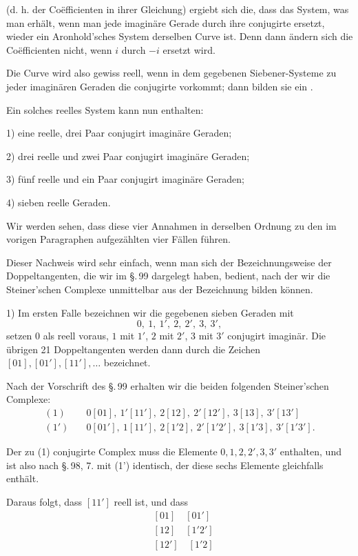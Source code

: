 (d. h. der Coëfficienten in ihrer Gleichung) ergiebt sich die, dass
das System, was man erhält, wenn man jede imaginäre Gerade
durch ihre conjugirte ersetzt, wieder ein Aronhold'sches System
derselben Curve ist. Denn dann ändern sich die Coëfficienten
nicht, wenn $i$ durch $-i$ ersetzt wird.

Die Curve wird also gewiss reell, wenn in dem gegebenen
Siebener-Systeme zu jeder imaginären Geraden die conjugirte
vorkommt; dann bilden sie ein .

Ein solches reelles System kann nun enthalten:

1) eine reelle, drei Paar conjugirt imaginäre Geraden;

2) drei reelle und zwei Paar conjugirt imaginäre Geraden;

3) fünf reelle und ein Paar conjugirt imaginäre Geraden;

4) sieben reelle Geraden.

Wir werden sehen, dass diese vier Annahmen in derselben
Ordnung zu den im vorigen Paragraphen aufgezählten vier
Fällen führen.

Dieser Nachweis wird sehr einfach, wenn man sich der
Bezeichnungsweise der Doppeltangenten, die wir im \S.\,99 dargelegt
 haben, bedient, nach der wir die Steiner'schen Complexe
 unmittelbar aus der Bezeichnung bilden können.

1) Im ersten Falle bezeichnen wir die gegebenen sieben
Geraden mit
\[
0,\ 1,\ 1',\ 2,\ 2',\ 3,\ 3',
\]
setzen $0$ als reell voraus, $1$ mit $1'$, $2$ mit $2'$, $3$ mit $3'$ conjugirt
imaginär. Die übrigen 21 Doppeltangenten werden dann durch
die Zeichen $[01], [01'], [11'], \dots$ bezeichnet.

Nach der Vorschrift des \S.\,99 erhalten wir die beiden
folgenden Steiner'schen Complexe:
\[
\begin{aligned}
(1)&\quad 0[01],\ 1'[11'],\ 2[12],\ 2'[12'],\ 3[13],\ 3'[13']\\
(1')&\quad 0[01'],\ 1[11'],\ 2[1'2],\ 2'[1'2'],\ 3[1'3],\ 3'[1'3'].
\end{aligned}
\]

Der zu (1) conjugirte Complex muss die Elemente $0,1,2,2',3,3'$
enthalten, und ist also nach \S.\,98, 7. mit (1') identisch, der
diese sechs Elemente gleichfalls enthält.

Daraus folgt, dass $[11']$ reell ist, und dass
\[
\begin{aligned}
&{}[01]\quad [01']\\
&{}[12]\quad [1'2']\\
&{}[12']\quad [1'2]
\end{aligned}
\]
